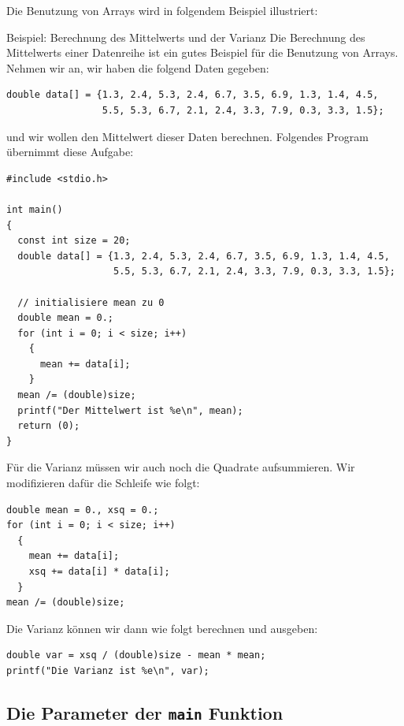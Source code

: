 Die Benutzung von Arrays wird in folgendem Beispiel illustriert:
\begin{myexampleprogram}{Beispiel: Berechnung des Mittelwerts und der Varianz}
  Die Berechnung des Mittelwerts einer Datenreihe ist ein gutes Beispiel für die Benutzung von Arrays.
  Nehmen wir an, wir haben die folgend Daten gegeben:
\begin{lstlisting}
double data[] = {1.3, 2.4, 5.3, 2.4, 6.7, 3.5, 6.9, 1.3, 1.4, 4.5,
                 5.5, 5.3, 6.7, 2.1, 2.4, 3.3, 7.9, 0.3, 3.3, 1.5};
\end{lstlisting}
  und wir wollen den Mittelwert dieser Daten berechnen.
  Folgendes Program übernimmt diese Aufgabe:
\begin{lstlisting}
#include <stdio.h>

int main()
{
  const int size = 20;
  double data[] = {1.3, 2.4, 5.3, 2.4, 6.7, 3.5, 6.9, 1.3, 1.4, 4.5,
                   5.5, 5.3, 6.7, 2.1, 2.4, 3.3, 7.9, 0.3, 3.3, 1.5};

  // initialisiere mean zu 0
  double mean = 0.;
  for (int i = 0; i < size; i++)
    {
      mean += data[i];
    }
  mean /= (double)size;
  printf("Der Mittelwert ist %e\n", mean);
  return (0);
}
\end{lstlisting}
  Für die Varianz müssen wir auch noch die Quadrate aufsummieren.
  Wir modifizieren dafür die Schleife wie folgt:
\begin{lstlisting}
double mean = 0., xsq = 0.;
for (int i = 0; i < size; i++)
  {
    mean += data[i];
    xsq += data[i] * data[i];
  }
mean /= (double)size;
\end{lstlisting}
  Die Varianz können wir dann wie folgt berechnen und ausgeben:
\begin{lstlisting}
double var = xsq / (double)size - mean * mean;
printf("Die Varianz ist %e\n", var);
\end{lstlisting}
\end{myexampleprogram}

\subsection{Die Parameter der \texttt{main} Funktion}


